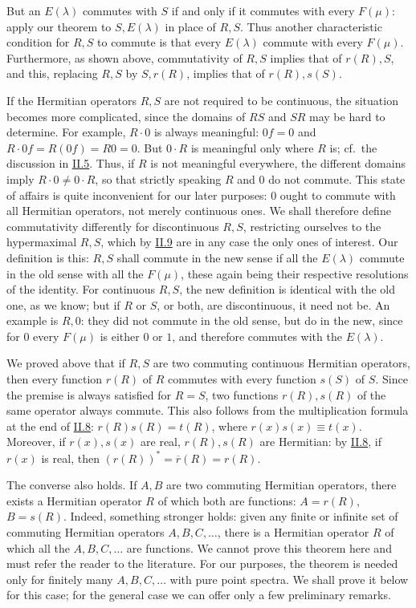 \documentclass[fontsize=13pt,twoside,openany,headings=normal,parskip=false,bookmarkpackage=false,DIV=calc]{scrbook}
\begin{document}
But an $E(\lambda)$ commutes with $S$ if and only if it commutes with every $F(\mu)$: apply our theorem to $S,E(\lambda)$ in place of $R,S$. Thus another characteristic condition for $R,S$ to commute is that every $E(\lambda)$ commute with every $F(\mu)$. Furthermore, as shown above, commutativity of $R,S$ implies that of $r(R),S$, and this, replacing $R,S$ by $S,r(R)$, implies that of $r(R),s(S)$.

\hypertarget{origpage-90}{}%
If the Hermitian operators $R,S$ are not required to be continuous, the situation becomes more complicated, since the domains of $RS$ and $SR$ may be hard to determine. For example, $R\cdot0$ is always meaningful: $0f=0$ and $R\cdot0f=R(0f)=R0=0$. But $0\cdot R$ is meaningful only where $R$ is; cf.\ the discussion in \hyperref[sec:II.5]{II.5}. Thus, if $R$ is not meaningful everywhere, the different domains imply $R\cdot0\ne0\cdot R$, so that strictly speaking $R$ and $0$ do not commute. This state of affairs is quite inconvenient for our later purposes: $0$ ought to commute with all Hermitian operators, not merely continuous ones. We shall therefore define commutativity differently for discontinuous $R,S$, restricting ourselves to the hypermaximal $R,S$, which by \hyperref[sec:II.9]{II.9} are in any case the only ones of interest. Our definition is this: $R,S$ shall commute in the new sense if all the $E(\lambda)$ commute in the old sense with all the $F(\mu)$, these again being their respective resolutions of the identity. For continuous $R,S$, the new definition is identical with the old one, as we know; but if $R$ or $S$, or both, are discontinuous, it need not be. An example is $R,0$: they did not commute in the old sense, but do in the new, since for $0$ every $F(\mu)$ is either $0$ or $1$, and therefore commutes with the $E(\lambda)$.

We proved above that if $R,S$ are two commuting continuous Hermitian operators, then every function $r(R)$ of $R$ commutes with every function $s(S)$ of $S$. Since the premise is always satisfied for $R=S$, two functions $r(R),s(R)$ of the same operator always commute. This also follows from the multiplication formula at the end of \hyperref[sec:II.8]{II.8}: $r(R)s(R)=t(R)$, where $r(x)s(x)\equiv t(x)$. Moreover, if $r(x),s(x)$ are real, $r(R),s(R)$ are Hermitian: by \hyperref[sec:II.8]{II.8}, if $r(x)$ is real, then $(r(R))^*=\overline r(R)=r(R)$.

The converse also holds. If $A,B$ are two commuting Hermitian operators, there exists a Hermitian operator $R$ of which both are functions: $A=r(R)$, $B=s(R)$. Indeed, something stronger holds: given any finite or infinite set of commuting Hermitian operators $A,B,C,\ldots$, there is a Hermitian operator $R$ of which all the $A,B,C,\ldots$ are functions. We cannot prove this theorem here and must refer the reader to the literature. For our purposes, the theorem is needed only for finitely many $A,B,C,\ldots$ with pure point spectra. We shall prove it below for this case; for the general case we can offer only a few preliminary remarks.
\end{document}

